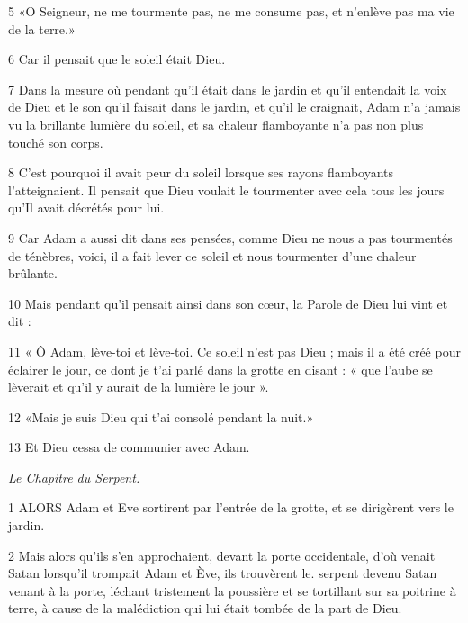 \par 5 «O Seigneur, ne me tourmente pas, ne me consume pas, et n'enlève pas ma vie de la terre.»

\par 6 Car il pensait que le soleil était Dieu.

\par 7 Dans la mesure où pendant qu'il était dans le jardin et qu'il entendait la voix de Dieu et le son qu'il faisait dans le jardin, et qu'il le craignait, Adam n'a jamais vu la brillante lumière du soleil, et sa chaleur flamboyante n'a pas non plus touché son corps.

\par 8 C'est pourquoi il avait peur du soleil lorsque ses rayons flamboyants l'atteignaient. Il pensait que Dieu voulait le tourmenter avec cela tous les jours qu'Il avait décrétés pour lui.

\par 9 Car Adam a aussi dit dans ses pensées, comme Dieu ne nous a pas tourmentés de ténèbres, voici, il a fait lever ce soleil et nous tourmenter d'une chaleur brûlante.

\par 10 Mais pendant qu'il pensait ainsi dans son cœur, la Parole de Dieu lui vint et dit :

\par 11 « Ô Adam, lève-toi et lève-toi. Ce soleil n'est pas Dieu ; mais il a été créé pour éclairer le jour, ce dont je t'ai parlé dans la grotte en disant : « que l'aube se lèverait et qu'il y aurait de la lumière le jour ».

\par 12 «Mais je suis Dieu qui t'ai consolé pendant la nuit.»

\par 13 Et Dieu cessa de communier avec Adam.




\par \textit{Le Chapitre du Serpent.}

\par 1 ALORS Adam et Eve sortirent par l'entrée de la grotte, et se dirigèrent vers le jardin.

\par 2 Mais alors qu'ils s'en approchaient, devant la porte occidentale, d'où venait Satan lorsqu'il trompait Adam et Ève, ils trouvèrent le. serpent devenu Satan venant à la porte, léchant tristement la poussière et se tortillant sur sa poitrine à terre, à cause de la malédiction qui lui était tombée de la part de Dieu.

